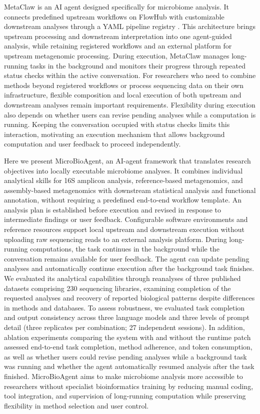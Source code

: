 \documentclass[10pt,letterpaper]{article}
\begin{document}
MetaClaw is an AI agent designed specifically for microbiome analysis.
It connects predefined upstream workflows on FlowHub with customizable
downstream analyses through a YAML pipeline registry
\parencite{zhang2026metaclaw}.  This architecture brings upstream processing
and downstream interpretation into one agent-guided analysis, while retaining
registered workflows and an external platform for upstream metagenomic
processing.  During execution, MetaClaw manages long-running tasks in the 
background and monitors their progress through repeated status checks within 
the active conversation. For researchers who need to combine methods beyond 
registered workflows or process sequencing data on their own infrastructure, 
flexible composition and local execution of both upstream and downstream analyses 
remain important requirements. Flexibility during execution also depends on whether 
users can revise pending analyses while a computation is running. Keeping the 
conversation occupied with status checks limits this interaction, motivating an 
execution mechanism that allows background computation and user feedback to proceed 
independently.

Here we present MicroBioAgent, an AI-agent framework that translates research
objectives into locally executable microbiome analyses.  It combines
individual analytical skills for 16S amplicon analysis, reference-based
metagenomics, and assembly-based metagenomics with downstream statistical
analysis and functional annotation, without requiring a predefined end-to-end
workflow template.  An analysis plan is established before execution and
revised in response to intermediate findings or user feedback.  Configurable
software environments and reference resources support local upstream and
downstream execution without uploading raw sequencing reads to an external
analysis platform.  During long-running computations, the task continues in
the background while the conversation remains available for user feedback.
The agent can update pending analyses and automatically continue execution
after the background task finishes.  We evaluated its analytical capabilities
through reanalyses of three published datasets comprising 230 sequencing
libraries, examining completion of the requested analyses and recovery of
reported biological patterns despite differences in methods and databases.
To assess robustness, we evaluated task completion and output consistency
across three language models and three levels of prompt detail (three
replicates per combination; 27 independent sessions).  In addition, ablation
experiments comparing the system with and without the runtime patch assessed
end-to-end task completion, method adherence, and token consumption, as well
as whether users could revise pending analyses while a background task was
running and whether the agent automatically resumed analysis after the task
finished.
MicroBioAgent aims to make microbiome analysis more accessible to researchers 
without specialist bioinformatics training by reducing manual coding, tool 
integration, and supervision of long-running computation while preserving 
flexibility in method selection and user control.
\end{document}
